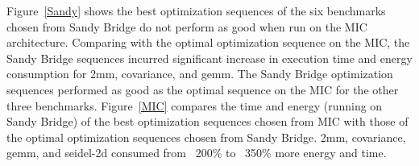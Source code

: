 \begin{figure}
\centering
{} 
\caption{
}                   
\label{fig:Brdr2d-TE}                                                   
\end{figure} 

Figure~\ref{Sandy} shows the best optimization sequences of the six benchmarks
chosen from Sandy Bridge do not perform as good when run on the MIC architecture. 
Comparing with the optimal optimization sequence on the MIC, the Sandy Bridge
sequences incurred significant increase in execution time and energy consumption
for 2mm, covariance, and gemm. The Sandy Bridge optimization sequences 
performed as good as the optimal sequence on the MIC for the other three benchmarks. 
Figure~\ref{MIC} compares the time and energy (running on Sandy Bridge) of 
the best optimization sequences chosen from MIC with those of the optimal optimization 
sequences chosen from Sandy Bridge. 2mm, covariance, gemm, and seidel-2d consumed
from ~200\% to ~350\% more energy and time. 
